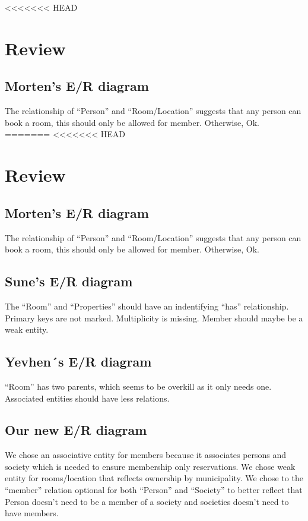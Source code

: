 <<<<<<< HEAD
\section{Review}
\subsection{Morten’s E/R diagram} 
The relationship of ``Person'' and ``Room/Location'' suggests that any person can book a room, this should only be allowed for member. Otherwise, Ok.
=======
<<<<<<< HEAD
\section{Review}


\subsection{Morten’s E/R diagram} 
The relationship of ``Person'' and ``Room/Location'' suggests that any person can book a room, this should only be allowed for member. Otherwise, Ok.

\subsection{Sune’s E/R diagram}
The ``Room'' and ``Properties'' should have an indentifying ``has'' relationship.
Primary keys are not marked. Multiplicity is missing. Member should maybe be a weak entity. 


\subsection{Yevhen´s E/R diagram}
``Room'' has two parents, which seems to be overkill as it only needs one. 
Associated entities should have less relations. 

\subsection{Our new E/R diagram}
We chose an associative entity for members because it associates persons and society which is needed 
to ensure membership only reservations.
We chose weak entity for rooms/location that reflects ownership by municipality. 
We chose to the ``member'' relation optional for both ``Person'' and ``Society''
to better reflect that Person doesn't need to be a member of a society and 
societies doesn't need to have members.

\newpage

